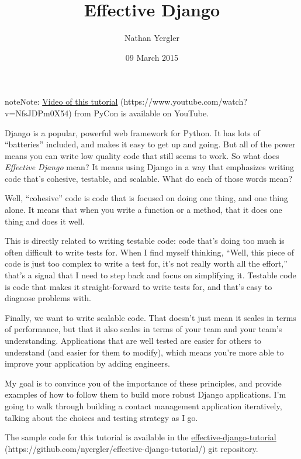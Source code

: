 \documentclass[letterpaper,10pt,english]{sphinxmanual}
\title{Effective Django}
\date{09 March 2015}
\author{Nathan Yergler}
\begin{document}
\maketitle
\tableofcontents
{}\label{tutorial/index::doc}


\begin{notice}{note}{Note:}
\href{https://www.youtube.com/watch?v=NfsJDPm0X54}{Video of this tutorial} (https://www.youtube.com/watch?v=NfsJDPm0X54) from PyCon is available on YouTube.
\end{notice}

Django is a popular, powerful web framework for Python. It has lots of
``batteries'' included, and makes it easy to get up and going. But all
of the power means you can write low quality code that still seems to
work. So what does \emph{Effective Django} mean? It means using Django in a
way that emphasizes writing code that's cohesive, testable, and
scalable. What do each of those words mean?

Well, ``cohesive'' code is code that is focused on doing one thing, and
one thing alone. It means that when you write a function or a method,
that it does one thing and does it well.

This is directly related to writing testable code: code that's doing
too much is often difficult to write tests for. When I find myself
thinking, ``Well, this piece of code is just too complex to write a
test for, it's not really worth all the effort,'' that's a signal that
I need to step back and focus on simplifying it. Testable code is code
that makes it straight-forward to write tests for, and that's easy to
diagnose problems with.

Finally, we want to write scalable code. That doesn't just mean it
scales in terms of performance, but that it also scales in terms of
your team and your team's understanding. Applications that are well
tested are easier for others to understand (and easier for them to
modify), which means you're more able to improve your application by
adding engineers.

My goal is to convince you of the importance of these principles, and
provide examples of how to follow them to build more robust Django
applications. I'm going to walk through building a contact management
application iteratively, talking about the choices and testing
strategy as I go.

The sample code for this tutorial is available in the
\href{https://github.com/nyergler/effective-django-tutorial/}{effective-django-tutorial} (https://github.com/nyergler/effective-django-tutorial/) git repository.
\end{document}
